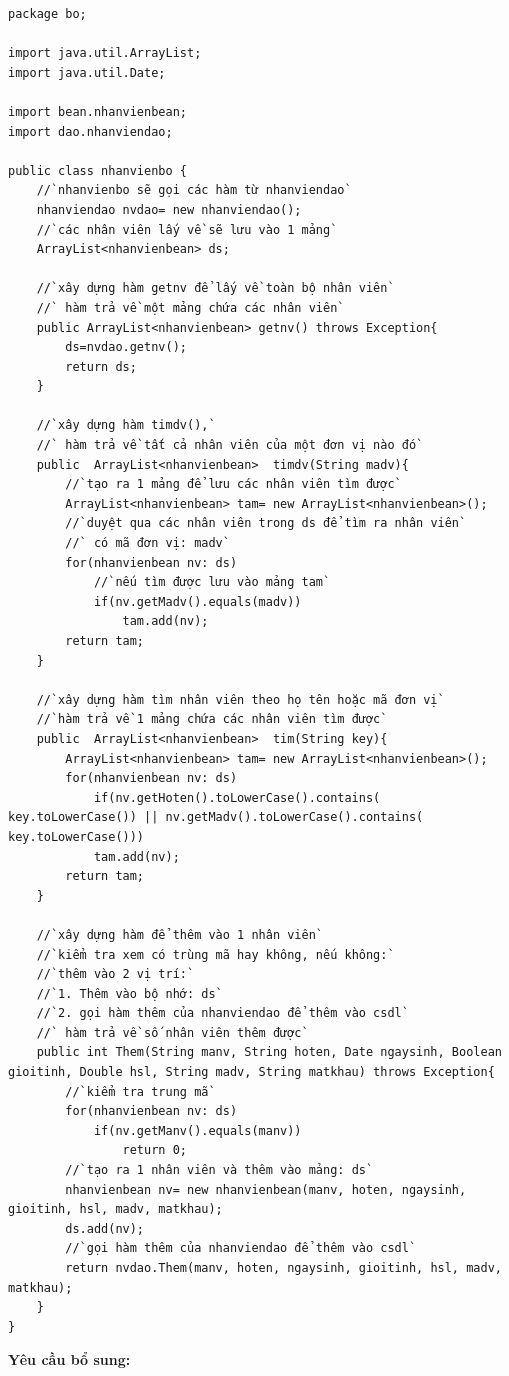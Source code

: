 \begin{lstlisting}[escapechar=`]
package bo;

import java.util.ArrayList;
import java.util.Date;

import bean.nhanvienbean;
import dao.nhanviendao;

public class nhanvienbo {
	//`nhanvienbo sẽ gọi các hàm từ nhanviendao`
	nhanviendao nvdao= new nhanviendao();
	//`các nhân viên lấy về sẽ lưu vào 1 mảng`
	ArrayList<nhanvienbean> ds;
	
	//`xây dựng hàm getnv để lấy về toàn bộ nhân viên`
	//` hàm trả về một mảng chứa các nhân viên`
	public ArrayList<nhanvienbean> getnv() throws Exception{
		ds=nvdao.getnv();
		return ds;
	}
	
	//`xây dựng hàm timdv(),`
	//` hàm trả về tất cả nhân viên của một đơn vị nào đó`
	public  ArrayList<nhanvienbean>  timdv(String madv){
		//`tạo ra 1 mảng để lưu các nhân viên tìm được`
		ArrayList<nhanvienbean> tam= new ArrayList<nhanvienbean>();
		//`duyệt qua các nhân viên trong ds để tìm ra nhân viên`
		//` có mã đơn vị: madv`
		for(nhanvienbean nv: ds)
			//`nếu tìm được lưu vào mảng tam`
			if(nv.getMadv().equals(madv))
				tam.add(nv);
		return tam;
	}
	
	//`xây dựng hàm tìm nhân viên theo họ tên hoặc mã đơn vị`
	//`hàm trả về 1 mảng chứa các nhân viên tìm được`
	public  ArrayList<nhanvienbean>  tim(String key){
		ArrayList<nhanvienbean> tam= new ArrayList<nhanvienbean>();
		for(nhanvienbean nv: ds)
			if(nv.getHoten().toLowerCase().contains( key.toLowerCase()) || nv.getMadv().toLowerCase().contains( key.toLowerCase()))
			tam.add(nv);
		return tam;
	}
	
	//`xây dựng hàm để thêm vào 1 nhân viên`
	//`kiểm tra xem có trùng mã hay không, nếu không:`
	//`thêm vào 2 vị trí:`
	//`1. Thêm vào bộ nhớ: ds`
	//`2. gọi hàm thêm của nhanviendao để thêm vào csdl`
	//` hàm trả về số nhân viên thêm được`  
	public int Them(String manv, String hoten, Date ngaysinh, Boolean gioitinh, Double hsl, String madv, String matkhau) throws Exception{
		//`kiểm tra trung mã`
		for(nhanvienbean nv: ds)
			if(nv.getManv().equals(manv))
				return 0;
		//`tạo ra 1 nhân viên và thêm vào mảng: ds`
		nhanvienbean nv= new nhanvienbean(manv, hoten, ngaysinh, gioitinh, hsl, madv, matkhau);
		ds.add(nv);
		//`gọi hàm thêm của nhanviendao để thêm vào csdl`
		return nvdao.Them(manv, hoten, ngaysinh, gioitinh, hsl, madv, matkhau);
	}
}

\end{lstlisting}
\textbf{Yêu cầu bổ sung:}

